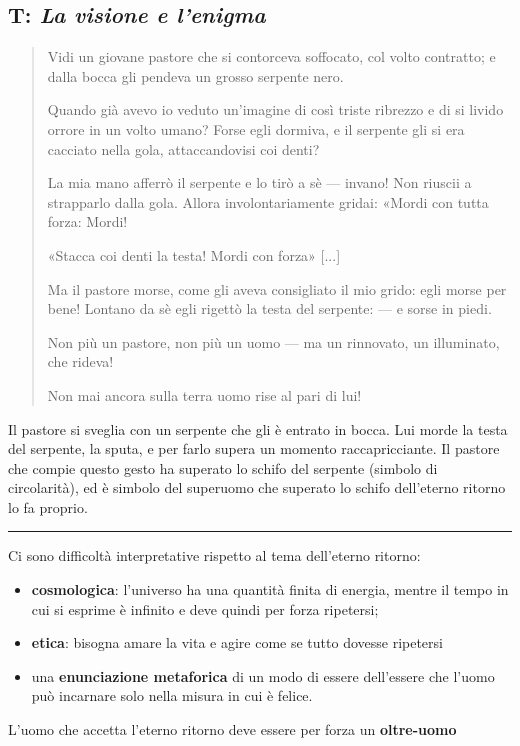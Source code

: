 \documentclass[a4paper, twoside, titlepage]{book}
\newcommand{\citazione}[1]{%
  \begin{quotation}
  #1
  \end{quotation}}
\begin{document}
\subsection{T: \textit{La visione e l'enigma}}

\citazione{Vidi un giovane pastore che si contorceva soffocato, col volto contratto; e dalla bocca gli pendeva un grosso serpente nero.

Quando già avevo io veduto un’imagine di così triste ribrezzo e di si livido orrore in un volto umano? Forse egli dormiva, e il serpente gli si era cacciato nella gola, attaccandovisi coi denti?

La mia mano afferrò il serpente e lo tirò a sè — invano! Non riuscii a strapparlo dalla gola. Allora involontariamente gridai: «Mordi con tutta forza: Mordi!

«Stacca coi denti la testa! Mordi con forza» [...]

Ma il pastore morse, come gli aveva consigliato il mio grido: egli morse per bene! Lontano da sè egli rigettò la testa del serpente: — e sorse in piedi.

Non più un pastore, non più un uomo — ma un rinnovato, un illuminato, che rideva!

Non mai ancora sulla terra uomo rise al pari di lui!}

Il pastore si sveglia con un serpente che gli è entrato in bocca. Lui morde la testa del serpente, la sputa, e per farlo supera un momento raccapricciante. Il pastore che compie questo gesto ha superato lo schifo del serpente (simbolo di circolarità), ed è simbolo del superuomo che superato lo schifo dell'eterno ritorno lo fa proprio.

\medskip\hrule\medskip

Ci sono difficoltà interpretative rispetto al tema dell'eterno ritorno: 
\begin{itemize}
\item \textbf{cosmologica}: l'universo ha una quantità finita di energia, mentre il tempo in cui si esprime è infinito e deve quindi per forza ripetersi;
\item \textbf{etica}: bisogna amare la vita e agire come se tutto dovesse ripetersi
\item una \textbf{enunciazione metaforica} di un modo di essere dell'essere che l'uomo può incarnare solo nella misura in cui è felice.
\end{itemize}

L'uomo che accetta l'eterno ritorno deve essere per forza un \textbf{oltre-uomo}
\end{document}
